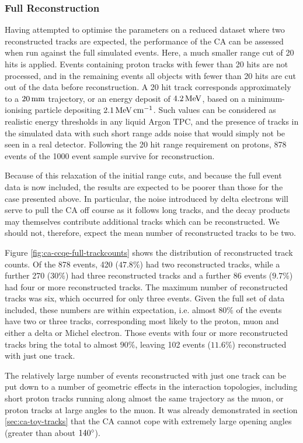 \subsubsection{Full Reconstruction}
Having attempted to optimise the parameters on a reduced dataset where two reconstructed tracks are expected, the performance of the \ac{CA} can be assessed when run against the full simulated events. Here, a much smaller range cut of 20 hits is applied. Events containing proton tracks with fewer than 20 hits are not processed, and in the remaining events all objects with fewer than 20 hits are cut out of the data before reconstruction. A 20 hit track corresponds approximately to a $20\,\mathrm{mm}$ trajectory, or an energy deposit of $4.2\,\mathrm{MeV}$, based on a minimum-ionising particle depositing $2.1\,\mathrm{MeV} \,\mathrm{cm}^{-1}$. Such values can be considered as realistic energy thresholds in any liquid Argon TPC, and the presence of tracks in the simulated data with such short range adds noise that would simply not be seen in a real detector. Following the 20 hit range requirement on protons, 878 events of the 1000 event sample survive for reconstruction. 

Because of this relaxation of the initial range cuts, and because the full event data is now included, the results are expected to be poorer than those for the case presented above. In particular, the noise introduced by delta electrons will serve to pull the \ac{CA} off course as it follows long tracks, and the decay products may themselves contribute additional tracks which can be reconstructed. We should not, therefore, expect the mean number of reconstructed tracks to be two.

Figure \ref{fig:ca-ccqe-full-trackcounts} shows the distribution of reconstructed track counts. Of the 878 events, 420 ($47.8\%$) had two reconstructed tracks, while a further 270 ($30\%$) had three reconstructed tracks and a further 86 events ($9.7\%$) had four or more reconstructed tracks. The maximum number of reconstructed tracks was six, which occurred for only three events. Given the full set of data included, these numbers are within expectation, i.e. almost $80\%$ of the events have two or three tracks, corresponding most likely to the proton, muon and either a delta or Michel electron. Those events with four or more reconstructed tracks bring the total to almost $90\%$, leaving 102 events ($11.6\%$) reconstructed with just one track.

The relatively large number of events reconstructed with just one track can be put down to a number of geometric effects in the interaction topologies, including short proton tracks running along almost the same trajectory as the muon, or proton tracks at large angles to the muon. It was already demonstrated in section \ref{sec:ca-toy-tracks} that the \ac{CA} cannot cope with extremely large opening angles (greater than about $140^\circ$).

